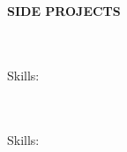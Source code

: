 %
%
%
%
%



\vspace{\spaceSection}
\begin{center}
    \textbf{SIDE PROJECTS}
\end{center}
\vspace{\spaceSection}

\textbf{\sideProjA} \hfill \sideProjADate \\
\sideProjAFor \\
Skills: \sideProjASkills
\vspace{\spaceItems}

\textbf{\sideProjB} \hfill \sideProjBDate \\
\sideProjBFor \\
Skills: \sideProjBSkills
\vspace{\spaceItems}

